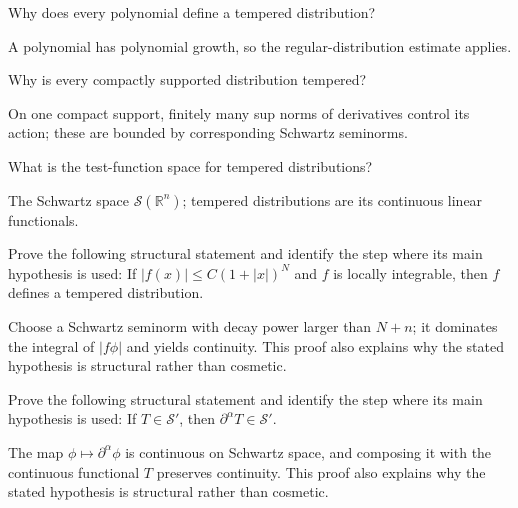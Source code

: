 \begin{problem}\label{prob:iii18-problem-06}
Why does every polynomial define a tempered distribution?
\end{problem}
\begin{solution}
A polynomial has polynomial growth, so the regular-distribution estimate
applies.
\end{solution}

\begin{problem}\label{prob:iii18-problem-07}
Why is every compactly supported distribution tempered?
\end{problem}
\begin{solution}
On one compact support, finitely many sup norms of derivatives control its
action; these are bounded by corresponding Schwartz seminorms.
\end{solution}

\begin{problem}\label{prob:iii18-problem-08}
What is the test-function space for tempered distributions?
\end{problem}
\begin{solution}
The Schwartz space \(\mathcal S(\mathbb R^n)\); tempered distributions are
its continuous linear functionals.
\end{solution}

\begin{problem}\label{prob:iii18-problem-09}
Prove the following structural statement and identify the step where its main hypothesis is used: If $|f(x)|\le C(1+|x|)^N$ and $f$ is locally integrable, then $f$ defines a tempered distribution.
\end{problem}
\begin{solution}
Choose a Schwartz seminorm with decay power larger than $N+n$; it dominates the integral of $|f\phi|$ and yields continuity. This proof also explains why the stated hypothesis is structural rather than cosmetic.
\end{solution}

\begin{problem}\label{prob:iii18-problem-10}
Prove the following structural statement and identify the step where its main hypothesis is used: If $T\in\mathcal S'$, then $\partial^\alpha T\in\mathcal S'$.
\end{problem}
\begin{solution}
The map $\phi\mapsto\partial^\alpha\phi$ is continuous on Schwartz space, and composing it with the continuous functional $T$ preserves continuity. This proof also explains why the stated hypothesis is structural rather than cosmetic.
\end{solution}

